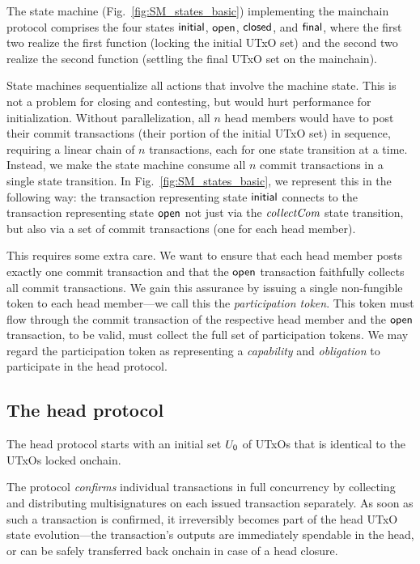 

The state machine (Fig.~\ref{fig:SM_states_basic}) implementing
the mainchain protocol comprises the four states $\mathsf{initial}$,
$\mathsf{open}$, $\mathsf{closed}$, and $\mathsf{final}$, where the first two realize
the first function (locking the initial UTxO set) and the
second two realize the second function (settling the final UTxO set on
the mainchain).

State machines sequentialize all actions that involve the machine state. This is
not a problem for closing and contesting, but would hurt performance for
initialization. Without parallelization, all $n$ head members would have to post
their commit transactions (their portion of the initial UTxO set) in sequence,
requiring a linear chain of $n$
transactions, %
each for one state transition at a time. Instead, we make the state machine
consume all $n$ commit transactions in a single state transition. In
Fig.~\ref{fig:SM_states_basic}, we represent this in the following way: the
transaction representing state $\mathsf{initial}$ connects to the transaction
representing state $\mathsf{open}$ not just via the $\textit{collectCom}$ state transition, but
also via a set of commit transactions (one for each head member).

This requires some extra care. We want to ensure that each
head member posts exactly one commit transaction and that the $\mathsf{open}$
transaction faithfully collects all commit
transactions. We gain this assurance by issuing a single non-fungible
token to each head member---we call this the \emph{participation
  token}.  This token must flow through the commit transaction of the
respective head member and the $\mathsf{open}$ transaction, to be valid, must
collect the full set of participation tokens. We may regard the
participation token as representing a \emph{capability} and
\emph{obligation} to participate in the head protocol.


\subsection{The head protocol}\label{sec:overview_hp}

The head protocol starts with an initial set $U_{0}$ of UTxOs that
is identical to the UTxOs locked onchain.

The protocol \emph{confirms} individual transactions in full
concurrency by collecting and distributing multisignatures on each
issued transaction separately.
As soon as such a transaction is confirmed, it irreversibly becomes
part of the head UTxO state evolution---the transaction's outputs
are immediately spendable in the head, or can be safely transferred
back onchain in case of a head closure.

